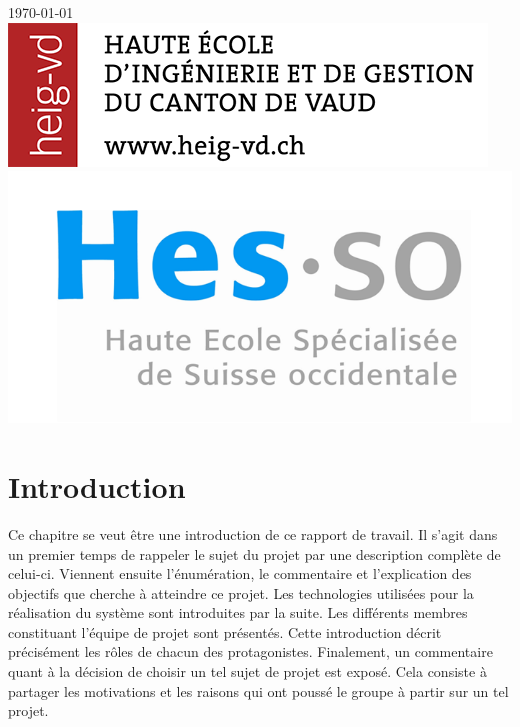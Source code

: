 \documentclass[11pt,a4paper,oldfontcommands]{memoir}
\begin{document}
\begin{titlepage}

{\large \today}\\[3cm]


\includegraphics[scale=0.3]{images/heigvd.png}
\hfill
\includegraphics[scale=0.6]{images/hesso.png}

\vfill
\end{titlepage}

\cleardoublepage
\tableofcontents*
\cleardoublepage
\listoffigures*
\cleardoublepage
\listoftables*
\cleardoublepage


\chapter{Introduction}

Ce chapitre se veut être une introduction de ce rapport de travail. Il s'agit dans un premier temps de rappeler le sujet du projet par une description complète de celui-ci. Viennent ensuite l'énumération, le commentaire et l'explication des objectifs que cherche à atteindre ce projet. Les technologies utilisées pour la réalisation du système sont introduites par la suite. Les différents membres constituant l'équipe de projet sont présentés. Cette introduction décrit précisément les rôles de chacun des protagonistes. Finalement, un commentaire quant à la décision de choisir un tel sujet de projet est exposé. Cela consiste à partager les motivations et les raisons qui ont poussé le groupe à partir sur un tel projet.
\end{document}
